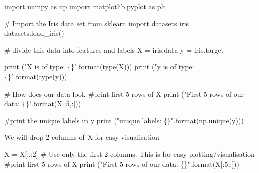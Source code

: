 \documentclass[
  letterpaper,
  DIV=11,
  numbers=noendperiod]{scrartcl}
\newenvironment{Shaded}{\begin{snugshade}}{\end{snugshade}}
\newcommand{\BuiltInTok}[1]{\textcolor[rgb]{0.00,0.23,0.31}{#1}}
\newcommand{\CommentTok}[1]{\textcolor[rgb]{0.37,0.37,0.37}{#1}}
\newcommand{\DecValTok}[1]{\textcolor[rgb]{0.68,0.00,0.00}{#1}}
\newcommand{\ImportTok}[1]{\textcolor[rgb]{0.00,0.46,0.62}{#1}}
\newcommand{\NormalTok}[1]{\textcolor[rgb]{0.00,0.23,0.31}{#1}}
\newcommand{\OperatorTok}[1]{\textcolor[rgb]{0.37,0.37,0.37}{#1}}
\newcommand{\SpecialCharTok}[1]{\textcolor[rgb]{0.37,0.37,0.37}{#1}}
\newcommand{\StringTok}[1]{\textcolor[rgb]{0.13,0.47,0.30}{#1}}
\begin{document}
\begin{Shaded}
\begin{Highlighting}[]
\ImportTok{import}\NormalTok{ numpy }\ImportTok{as}\NormalTok{ np}
\ImportTok{import}\NormalTok{ matplotlib.pyplot }\ImportTok{as}\NormalTok{ plt}

\CommentTok{\# Import the Iris data set }
\ImportTok{from}\NormalTok{ sklearn }\ImportTok{import}\NormalTok{ datasets}
\NormalTok{iris }\OperatorTok{=}\NormalTok{ datasets.load\_iris()}

\CommentTok{\# divide this data into features and labels}
\NormalTok{X }\OperatorTok{=}\NormalTok{ iris.data}
\NormalTok{y }\OperatorTok{=}\NormalTok{ iris.target}

\BuiltInTok{print}\NormalTok{ (}\StringTok{"X is of type: }\SpecialCharTok{\{\}}\StringTok{"}\NormalTok{.}\BuiltInTok{format}\NormalTok{(}\BuiltInTok{type}\NormalTok{(X)))}
\BuiltInTok{print}\NormalTok{ (}\StringTok{"y is of type: }\SpecialCharTok{\{\}}\StringTok{"}\NormalTok{.}\BuiltInTok{format}\NormalTok{(}\BuiltInTok{type}\NormalTok{(y)))}

\CommentTok{\# How does our data look}
\CommentTok{\#print first 5 rows of X}
\BuiltInTok{print}\NormalTok{ (}\StringTok{"First 5 rows of our data: }\SpecialCharTok{\{\}}\StringTok{"}\NormalTok{.}\BuiltInTok{format}\NormalTok{(X[:}\DecValTok{5}\NormalTok{,:]))}

\CommentTok{\#print the unique labels in y}
\BuiltInTok{print}\NormalTok{ (}\StringTok{"unique labels: }\SpecialCharTok{\{\}}\StringTok{"}\NormalTok{.}\BuiltInTok{format}\NormalTok{(np.unique(y)))}
\end{Highlighting}
\end{Shaded}

We will drop 2 columns of X for easy visualisation

\begin{Shaded}
\begin{Highlighting}[]
\NormalTok{X }\OperatorTok{=}\NormalTok{ X[:,:}\DecValTok{2}\NormalTok{] }\CommentTok{\# Use only the first 2 columns. This is for easy plotting/visualisation}
\CommentTok{\#print first 5 rows of X}
\BuiltInTok{print}\NormalTok{ (}\StringTok{"First 5 rows of our data: }\SpecialCharTok{\{\}}\StringTok{"}\NormalTok{.}\BuiltInTok{format}\NormalTok{(X[:}\DecValTok{5}\NormalTok{,:]))}
\end{Highlighting}
\end{Shaded}
\end{document}
